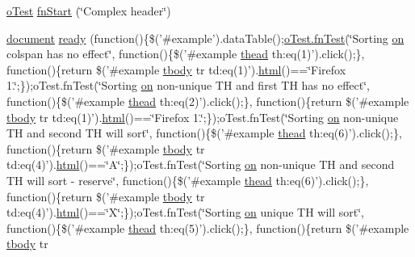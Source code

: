 \begin{DoxyCompactItemize}
\item 
\hyperlink{unit__test_8js_a3b2d259e2df3b6860d9047a92d09d0d6}{o\+Test} \hyperlink{-complex__header_8js_af1f250c9537664b403906426d77eadc9}{fn\+Start} (\char`\"{}Complex header\char`\"{})
\item 
\hyperlink{outside_events_8js_aa14f8e0338cced6720590fd2ea13bd4b}{document} \hyperlink{-complex__header_8js_a0b175836133dec0609bc3ee26f1ccb42}{ready} (function()\{\$('\#example').data\+Table();\hyperlink{__zero__config__objects__subarrays_8js_a7f100cfe8617a03cd30c47b5e15396a4}{o\+Test.\+fn\+Test}(\char`\"{}Sorting \hyperlink{fullpage_2plugin_8min_8js_a1cfa98b7fed2aaf9fee3b68dbb7f9497}{on} colspan has no effect\char`\"{}, function()\{\$('\#example \hyperlink{core_8constructor_8js_a856be760b6816c9591ce69f0a2b43693}{thead} th\+:eq(1)').click();\}, function()\{return \$('\#example \hyperlink{core_8constructor_8js_a99b0542c7c50fe8757c55bf9dac5f3be}{tbody} tr td\+:eq(1)').\hyperlink{tinymce_8jquery_8dev_8js_ac2090bcf2ff968c0083d5de53a6544f3}{html}()==\char`\"{}Firefox 1.\char`\"{};\});o\+Test.\+fn\+Test(\char`\"{}Sorting \hyperlink{fullpage_2plugin_8min_8js_a1cfa98b7fed2aaf9fee3b68dbb7f9497}{on} non-\/unique T\+H and first T\+H has no effect\char`\"{}, function()\{\$('\#example \hyperlink{core_8constructor_8js_a856be760b6816c9591ce69f0a2b43693}{thead} th\+:eq(2)').click();\}, function()\{return \$('\#example \hyperlink{core_8constructor_8js_a99b0542c7c50fe8757c55bf9dac5f3be}{tbody} tr td\+:eq(1)').\hyperlink{tinymce_8jquery_8dev_8js_ac2090bcf2ff968c0083d5de53a6544f3}{html}()==\char`\"{}Firefox 1.\char`\"{};\});o\+Test.\+fn\+Test(\char`\"{}Sorting \hyperlink{fullpage_2plugin_8min_8js_a1cfa98b7fed2aaf9fee3b68dbb7f9497}{on} non-\/unique T\+H and second T\+H will sort\char`\"{}, function()\{\$('\#example \hyperlink{core_8constructor_8js_a856be760b6816c9591ce69f0a2b43693}{thead} th\+:eq(6)').click();\}, function()\{return \$('\#example \hyperlink{core_8constructor_8js_a99b0542c7c50fe8757c55bf9dac5f3be}{tbody} tr td\+:eq(4)').\hyperlink{tinymce_8jquery_8dev_8js_ac2090bcf2ff968c0083d5de53a6544f3}{html}()==\char`\"{}A\char`\"{};\});o\+Test.\+fn\+Test(\char`\"{}Sorting \hyperlink{fullpage_2plugin_8min_8js_a1cfa98b7fed2aaf9fee3b68dbb7f9497}{on} non-\/unique T\+H and second T\+H will sort -\/ reserve\char`\"{}, function()\{\$('\#example \hyperlink{core_8constructor_8js_a856be760b6816c9591ce69f0a2b43693}{thead} th\+:eq(6)').click();\}, function()\{return \$('\#example \hyperlink{core_8constructor_8js_a99b0542c7c50fe8757c55bf9dac5f3be}{tbody} tr td\+:eq(4)').\hyperlink{tinymce_8jquery_8dev_8js_ac2090bcf2ff968c0083d5de53a6544f3}{html}()==\char`\"{}X\char`\"{};\});o\+Test.\+fn\+Test(\char`\"{}Sorting \hyperlink{fullpage_2plugin_8min_8js_a1cfa98b7fed2aaf9fee3b68dbb7f9497}{on} unique T\+H will sort\char`\"{}, function()\{\$('\#example \hyperlink{core_8constructor_8js_a856be760b6816c9591ce69f0a2b43693}{thead} th\+:eq(5)').click();\}, function()\{return \$('\#example \hyperlink{core_8constructor_8js_a99b0542c7c50fe8757c55bf9dac5f3be}{tbody} tr 
\end{DoxyCompactItemize}
